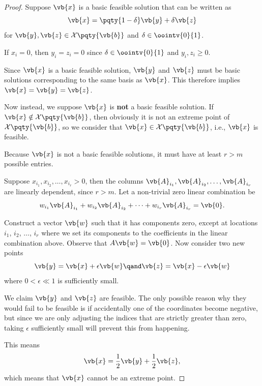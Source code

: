 \begin{proof}
    Suppose \(\vb{x}\) is a basic feasible solution that can be written as
    \[
        \vb{x} = \pqty{1 - \delta} \vb{y} + \delta \vb{z}
    \]
    for \(\vb{y}, \vb{z} \in \mathcal{X} \pqty{\vb{b}}\) and \(\delta \in \oointv{0}{1}\).

    If \(x_i = 0\), then \(y_i = z_i = 0\) since \(\delta \in \oointv{0}{1}\) and \(y_i, z_i \geq 0\).

    Since \(\vb{x}\) is a basic feasible solution, \(\vb{y}\) and \(\vb{z}\) must be basic solutions corresponding to the same basis as \(\vb{x}\). This therefore implies \(\vb{x} = \vb{y} = \vb{z}\).

    Now instead, we suppose \(\vb{x}\) is \textbf{not} a basic feasible solution. If \(\vb{x} \notin \mathcal{X} \pqty{\vb{b}}\), then obviously it is not an extreme point of \(\mathcal{X} \pqty{\vb{b}}\), so we consider that \(\vb{x} \in \mathcal{X} \pqty{\vb{b}}\), i.e., \(\vb{x}\) is feasible.

    Because \(\vb{x}\) is not a basic feasible solutions, it must have at least \(r > m\) possible entries.
    
    Suppose \(x_{i_1}, x_{i_2}, \ldots, x_{i_r} > 0\), then the columns \(\vb{A}_{i_1}, \vb{A}_{i_2}, \ldots, \vb{A}_{i_r}\) are linearly dependent, since \(r > m\). Let a non-trivial zero linear combination be
    \[
        w_{i_1} \vb{A}_{i_1} + w_{i_2} \vb{A}_{i_2} + \cdots + w_{i_r} \vb{A}_{i_r} = \vb{0}.
    \]

    Construct a vector \(\vb{w}\) such that it has components zero, except at locations \(i_1\), \(i_2\), \(\ldots\), \(i_r\) where we set its components to the coefficients in the linear combination above. Observe that \(A\vb{w} = \vb{0}\). Now consider two new points
    \[
        \vb{y} = \vb{x} + \epsilon \vb{w} \qand \vb{z} = \vb{x} - \epsilon \vb{w}
    \]
    where \(0 < \epsilon \ll 1\) is sufficiently small.
    
    We claim \(\vb{y}\) and \(\vb{z}\) are feasible. The only possible reason why they would fail to be feasible is if accidentally one of the coordinates become negative, but since we are only adjusting the indices that are strictly greater than zero, taking \(\epsilon\) sufficiently small will prevent this from happening.

    This means
    \[
        \vb{x} = \frac{1}{2} \vb{y} + \frac{1}{2} \vb{z},
    \]
    which means that \(\vb{x}\) cannot be an extreme point.
\end{proof}


